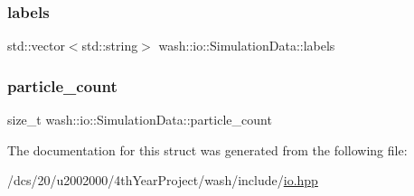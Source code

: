\subsubsection{\texorpdfstring{labels}{labels}}
{\footnotesize\ttfamily std\+::vector$<$std\+::string$>$ wash\+::io\+::\+Simulation\+Data\+::labels}

\mbox{\label{structwash_1_1io_1_1SimulationData_a21236f5ec63d5f10fedc79860baac63a}} 
\subsubsection{\texorpdfstring{particle\+\_\+count}{particle\_count}}
{\footnotesize\ttfamily size\+\_\+t wash\+::io\+::\+Simulation\+Data\+::particle\+\_\+count}



The documentation for this struct was generated from the following file\+:\begin{DoxyCompactItemize}
\item 
/dcs/20/u2002000/4th\+Year\+Project/wash/include/\mbox{\hyperlink{io_8hpp}{io.\+hpp}}\end{DoxyCompactItemize}
